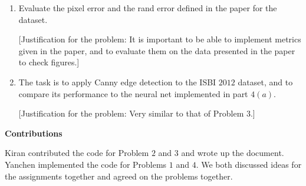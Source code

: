 \documentclass[12pt]{article}
\begin{document}
\begin{enumerate}
\item Evaluate the pixel error and the rand error defined in the paper for the dataset. 

[Justification for the problem: It is important to be able to implement metrics given in the paper, and to evaluate them on the data presented in the paper to check figures.]

\item The task is to apply Canny edge detection to the ISBI $2012$ dataset, and to compare its performance to the neural net implemented in part $4(a)$. 

[Justification for the problem: Very similar to that of Problem $3$.]

\end{enumerate}


\vspace{0.3in}

\large\textbf{Contributions}

Kiran contributed the code for Problem $2$ and $3$ and wrote up the document. 
Yanchen implemented the code for Problems $1$ and $4$. We both discussed ideas for the assignments together and agreed on the problems together.
\end{document}
